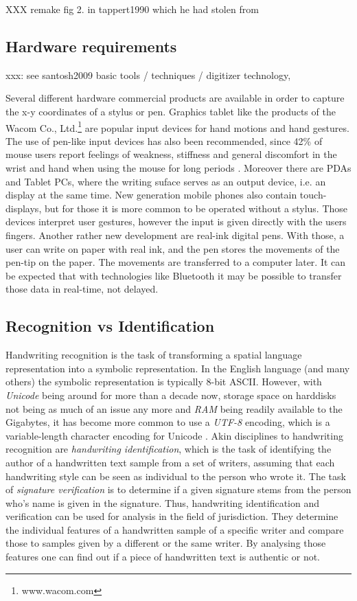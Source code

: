 XXX remake fig 2. in tappert1990 which he had stolen from 



\subsection{Hardware requirements}
\label{sec:hardwarerequirements}
xxx: see santosh2009 basic tools / techniques / digitizer technology, 

Several different hardware commercial products are available in order to
capture the x-y coordinates of a stylus or pen. Graphics tablet like the
products of the Wacom Co., Ltd.\footnote{www.wacom.com} are popular input
devices for hand motions and hand gestures. The use of pen-like input devices 
has also been recommended, since 42\% of mouse users report feelings of 
weakness, stiffness and general discomfort in the wrist and hand when 
using the mouse for long periods . Moreover there are
PDAs and Tablet PCs, where the writing suface serves as an output device,
i.e. an display at the same time. New generation mobile phones also contain
touch-displays, but for those it is more common to be operated without a 
stylus. Those devices interpret user gestures, however the input is given 
directly with the users fingers. Another rather new development are real-ink 
digital pens. With those, a user can write on paper with real ink, and the pen
stores the movements of the pen-tip on the paper. The movements are transferred 
to a computer later. It can be expected that with technologies like Bluetooth
it may be possible to transfer those data in real-time, not delayed.

\subsection{Recognition vs Identification}
\label{sec:recognitionvsidentification}

Handwriting recognition is the task of transforming a spatial language 
representation into a symbolic representation. In the English language
(and many others) the symbolic representation is typically 8-bit ASCII.
However, with \emph{Unicode} being around for more than a decade now,
storage space on harddisks not being as much of an issue any more and
\emph{RAM} being readily available to the Gigabytes, it has become more 
common to use a \emph{UTF-8}  encoding, which is a variable-length character 
encoding for Unicode .
Akin disciplines to handwriting recognition are 
\emph{handwriting identification}, which is the task of identifying the author
of a handwritten text sample from a set of writers, assuming that each
handwriting style can be seen as individual to the person who wrote it.
The task of \emph{signature verification} is to determine if a given signature
stems from the person who's name is given in the signature.
Thus, handwriting identification and verification can be used for 
analysis in the field of jurisdiction. They determine the individual features
of a handwritten sample of a specific writer and compare those
to samples given by a different or the same writer. By analysing those 
features one can find out if a piece of handwritten text is authentic or not.


